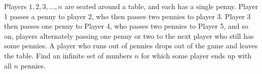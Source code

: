 Players $1,2,3,\ldots,n$ are seated around a table, and each has
a single penny.  Player 1 passes a penny to player 2, who then passes
two pennies to player 3.  Player 3 then passes one penny to Player 4,
who passes two pennies to Player 5, and so on, players alternately
passing one penny or two to the next player who still has some
pennies.  A player who runs out of pennies drops out of the game and
leaves the table.  Find an infinite set of numbers $n$ for which some
player ends up with all $n$ pennies.
